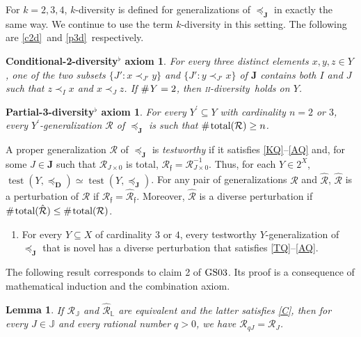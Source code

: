 \documentclass[ecta,nameyear,draft]{econsocart}
\newcommand{\test}{\operatorname{test}}
\newcommand{\countof}{\mathbin{\#}\hskip1pt}
\newcommand{\mc}{\mathcal}
\newcommand{\novel}{\mathfrak f}
\newcommand{\preceqb}{\mathbin{\preceq}}
\newcommand{\ext}{\mathrel{\mc R}}
\newcommand{\extb}{\mathbin{\mc R}}
\newcommand{\hext}{\mathrel{\hat{\mathrel{\mathcal R}}}}
\newcommand{\hextb}{\mathbin{\hat{\mathbin{\mathcal R}}}}
\newcommand{\total}{\textup{total}}
\newcommand{\mbbd}{{\mathbf D}}
\newcommand{\mbbipp}{{\mathds L}}
\newcommand{\mbbj}{\mathbf J}
\newcommand{\mbbjpp}{\mathds{J}}
\newcommand{\twodiv}{\textsc{ii}-\textup{diversity}}
\newcommand{\gsii}{$\textup{GS03}$}
\theoremstyle{plain}
\newtheorem{lemma}{Lemma}[theorem]
\newtheorem*{condtwodivq*}{Conditional-2-diversity$^\flat$ axiom}
\newtheorem*{parthreedivq*}{Partial-3-diversity$^\flat$ axiom}
\theoremstyle{remark}
\begin{document}
\begin{appendix}
  For $k = 2, 3, 4$, $k$-diversity is defined for generalizations of
  $\preceq_{\mbbj}$ in exactly the same way. We continue to use the term
  $k$-diversity in this setting.  The following are \ref{c2d}\ and
  \ref{p3d}\ respectively.
  \begin{condtwodivq*}
    \label{c2dQ} For every three distinct elements $x , y , z \in Y$, one
      of the two subsets $\{J': x \prec_{J'} y \}$ and $\{J': y \prec_{J'} x\}$
      of $\mbbj$ contains both $I$ and $J$ such that $z \prec _{I} x$ and $x
      \prec _{J} z$. If $\countof Y = 2$, then \twodiv\ holds on $Y$.
  \end{condtwodivq*}
  \begin{parthreedivq*}
    \label{p3dQ} For every $Y^{\prime} \subseteq Y$ with cardinality $n =
      2$ or $3$, every $Y^{\prime}$-generalization $\ext$ of $\preceq
      _{\mbbj}$ is such that $\countof{\total(\ext)} \geq n$.
  \end{parthreedivq*}

  A proper generalization $\ext$ of $\preceqb _{\mbbj}$ is \emph{testworthy}
  if it satisfies \ref{KQ}--\ref{AQ} and, for some $J\in \mbbj$ such that
  $\ext_{J\times 0}$ is total, $\extb_{\novel} = \extb_{J\times 0}^{-1}$. Thus,
  for each $Y \in 2^{X}$, $\test ( Y , \preceqb _{\mbbd} ) \simeq \test ( Y ,
  \preceqb _{\mbbj })$. For any pair of generalizations $\ext$ and $\hext$,
  $\hext$ is a perturbation of $\ext$ if $\extb_{\novel} = \hextb_{\novel}$.
  Moreover, $\hext$ is a {{diverse}} perturbation if $\countof \total (\hext)
  \leq \countof \total (\ext)$.
  \begin{enumerate}[label=\textsc{iv}-\textup{S}$^{\flat}$]
    \item\label{PQ} For every $Y \subseteq X$ of cardinality $3$ or $4$, every
      testworthy $Y$-generalization of $\preceqb _{\mbbj}$ that is novel has
      a {{diverse}} perturbation that satisfies \ref{TQ}–\ref{AQ}.
  \end{enumerate}

  The following result corresponds to claim 2 of \gsii. Its proof is a
  consequence of mathematical induction and the combination axiom.
  \vskip-15pt
  \begin{lemma}\label{lem-coneQ} If $\ext _ \mbbjpp$ and $\hext _ \mbbipp$ are
    equivalent and the latter satisfies \ref{C}, then for every $J \in \mbbjpp$
    and every rational number $q >0$, we have $\extb _{q J}  =  \extb _{J}$.
  \end{lemma}


\end{appendix}
\end{document}
